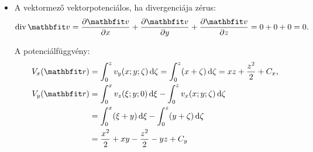 \documentclass[exercise]{math-standalone}
\begin{document}
\begin{exercise}
{\begin{enumerate}[a)]
\begin{itemize}
                    A potenciálfüggvény:
                    \begin{align*}
                      \varphi(\rvec r)
                       & =
                      \int_0^x v_x(\xi; y; z) \,\diff \xi +
                      \int_0^y v_y(0; \eta; z) \,\diff \eta +
                      \int_0^z v_z(0; 0; \zeta) \,\diff \zeta
                      \\
                       & =
                      \int_0^x (y + z) \,\diff \xi +
                      \int_0^y (0 + z) \,\diff \eta +
                      \int_0^z (0 + 0) \,\diff \zeta
                      \\
                       & =
                      xy + xz + yz + C
                      \text.
                    \end{align*}

                    A kereseett potenciálfüggvény:
                    \[
                      \varPhi (\rvec r)
                      =
                      xy + xz + yz
                      \text.
                    \]

              \item A vektormező vektorpotenciálos, ha divergenciája zérus:
                    \[
                      \Div \rvec v
                      =
                      \pdv{\rvec v}{x} + \pdv{\rvec v}{y} + \pdv{\rvec v}{z}
                      =
                      0 + 0 + 0
                      =
                      0
                      \text.
                    \]

                    A potenciálfüggvény:
                    \begin{align*}
                      V_x(\rvec r)
                       & =
                      \int_0^z v_y(x; y; \zeta) \,\diff \zeta
                      =
                      \int_0^z (x + \zeta) \,\diff \zeta
                      =
                      xz + \frac{z^2}{2} + C_x
                      \text,
                      \\
                      V_y(\rvec r)
                       & =
                      \int_0^x v_z(\xi; y; 0) \,\diff \xi -
                      \int_0^z v_x(x; y; \zeta) \,\diff \zeta
                      \\
                       & =
                      \int_0^x (\xi + y) \,\diff \xi -
                      \int_0^z (y + \zeta) \,\diff \zeta
                      \\
                       & =
                      \frac{x^2}{2} + xy -
                      \frac{z^2}{2} - yz + C_y
                    \end{align*}


\end{itemize}
\end{enumerate}}
\end{exercise}
\end{document}
